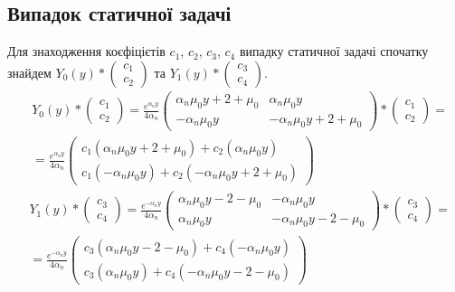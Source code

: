 \subsection*{Випадок статичної задачі}
Для знаходження коєфіцієтів $c_1$, $c_2$, $c_3$, $c_4$ випадку статичної задачі спочатку
знайдем $Y_0(y) * \begin{pmatrix}c_1 \\ c_2\end{pmatrix}$ та $Y_1(y) * \begin{pmatrix}c_3 \\ c_4\end{pmatrix}$.
\begin{align*}
    &Y_0(y) * \begin{pmatrix}c_1 \\ c_2\end{pmatrix} = \frac{e^{\alpha_n y}}{4\alpha_n} \begin{pmatrix}
        \alpha_n \mu_0 y + 2 + \mu_0 & \alpha_n \mu_0 y \\
        -\alpha_n \mu_0 y & -\alpha_n \mu_0 y + 2 + \mu_0
        \end{pmatrix} * \begin{pmatrix}c_1 \\ c_2\end{pmatrix} = \\
    &=\frac{e^{\alpha_n y}}{4\alpha_n} \begin{pmatrix}
        c_1(\alpha_n \mu_0 y + 2 + \mu_0) + c_2(\alpha_n \mu_0 y) \\
        c_1(-\alpha_n \mu_0 y) + c_2(-\alpha_n \mu_0 y + 2 + \mu_0)
        \end{pmatrix}
\end{align*}
\begin{align*}
    &Y_1(y) * \begin{pmatrix}c_3 \\ c_4\end{pmatrix} = \frac{e^{-\alpha_n y}}{4\alpha_n} \begin{pmatrix}
        \alpha_n \mu_0 y - 2 - \mu_0 & -\alpha_n \mu_0 y \\
        \alpha_n \mu_0 y & -\alpha_n \mu_0 y - 2 - \mu_0
        \end{pmatrix} * \begin{pmatrix}c_3 \\ c_4\end{pmatrix} = \\
    &=\frac{e^{-\alpha_n y}}{4\alpha_n} \begin{pmatrix}
        c_3(\alpha_n \mu_0 y - 2 - \mu_0) + c_4(-\alpha_n \mu_0 y) \\
        c_3(\alpha_n \mu_0 y) + c_4(-\alpha_n \mu_0 y - 2 - \mu_0)
        \end{pmatrix}
\end{align*}
